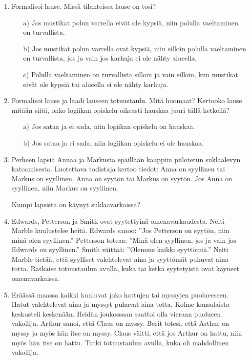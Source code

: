 \begin{enumerate}
\item Formalisoi lause. Missä tilanteissa lause on tosi?
\begin{itemize}
\item[a)]
Jos mustikat polun varrella eivät ole kypsiä, niin polulla vaeltaminen on turvallista.
\item[b)] Jos mustikat polun varrella ovat kypsiä, niin silloin polulla vaeltaminen on turvallista, jos ja vain jos karhuja ei ole nähty alueella. 
\item[c)] Polulla vaeltaminen on turvallista silloin ja vain silloin, kun mustikat eivät ole kypsiä tai alueella ei ole nähty karhuja.
\end{itemize}

\item Formalisoi lause ja laadi lauseen totuustaulu. Mitä huomaat? Kertooko lause mitään siitä, onko logiikan opiskelu oikeasti hauskaa juuri tällä hetkellä? 
\begin{itemize}
\item[a)] Jos sataa ja ei sada, niin logiikan opiskelu on hauskaa.
\item[b)] Jos sataa ja ei sada, niin logiikan opiskelu ei ole hauskaa.
\end{itemize}

\item Perheen lapsia Annaa ja Markusta epäillään kaappiin piilotetun suklaalevyn katoamisesta. Luotettava todistaja kertoo tiedot:
Anna on syyllinen tai Markus on syyllinen.
Anna on syytön tai Markus on syytön. 
Jos Anna on syyllinen, niin Markus on syyllinen.

Kumpi lapsista on käynyt suklaavarkaissa?

\item Edwards, Petterson ja Smith ovat syytettyinä omenavarkaudesta. Neiti Marble kuulustelee heitä. Edwards sanoo: ''Jos Petterson on syytön, niin minä olen syyllinen.'' Petterson toteaa: ''Minä olen syyllinen, jos ja vain jos Edwards on syyllinen.'' Smith väittää: ''Olemme kaikki syyttömiä.'' Neiti Marble tietää, että syylliset valehtelevat aina ja syyttömät puhuvat aina totta. Ratkaise totuustaulun avulla, kuka tai ketkä syytetyistä ovat käyneet omenavarkaissa.

\item Eräässä maassa kaikki kuuluvat joko hattujen tai myssyjen puolueeseen. Hatut valehtelevat aina ja myssyt puhuvat aina totta. Kolme kansalaista keskusteli keskenään. Heidän joukossaan saattoi olla vieraan puolueen vakoilija. Arthur sanoi, että Claus on myssy. Berit totesi, että Arthur on myssy ja myös hän itse on myssy. Claus väitti, että jos Arthur on hattu, niin myös hän itse on hattu. Tutki totuustaulun avulla, kuka oli mahdollinen vakoilija.


\end{enumerate}
